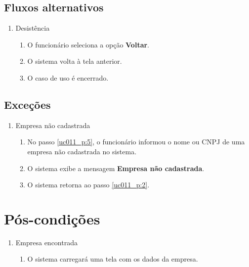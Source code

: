 \subsection{Fluxos alternativos}

\begin{enumerate}[label=A\arabic*]
	\item Desistência
	\begin{enumerate}[label*=.\arabic*]
		\item O funcionário seleciona a opção \textbf{Voltar}.
		\item O sistema volta à tela anterior.
		\item O caso de uso é encerrado.		
	\end{enumerate}	
\end{enumerate}

\subsection{Exceções}

\begin{enumerate}[label=E\arabic*]
	\item Empresa não cadastrada \label{uc011_e:1}
	\begin{enumerate}[label*=.\arabic*]
		\item[] No passo \ref{uc011_p:5}, o funcionário informou o nome ou CNPJ de uma empresa não cadastrada no sistema.
		\item O sistema exibe a mensagem \textbf{Empresa não cadastrada}.
		\item O sistema retorna ao passo \ref{uc011_p:2}.
	\end{enumerate}
\end{enumerate}

\section{Pós-condições}

\begin{enumerate}
	\item Empresa encontrada
	\begin{enumerate}
		\item O sistema carregará uma tela com os dados da empresa.
	\end{enumerate}
\end{enumerate}